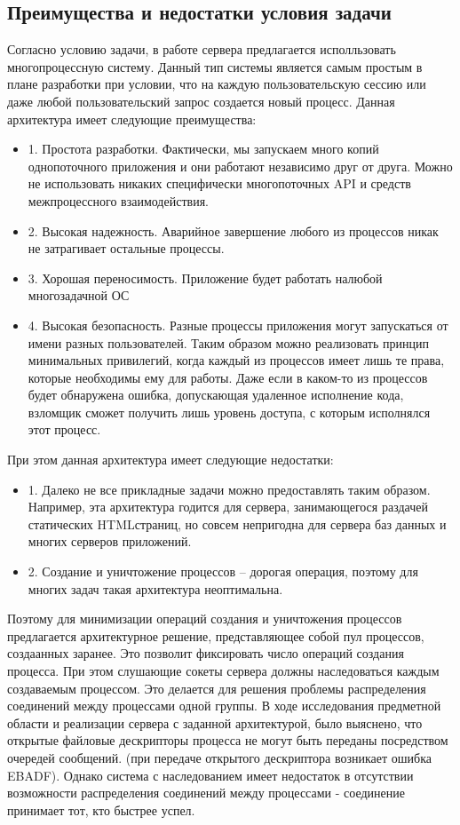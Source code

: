 \documentclass[a4paper,12pt]{report}
\begin{document}
\subsection{Преимущества и недостатки условия задачи}
Согласно условию задачи, в работе сервера предлагается исполльзовать многопроцессную систему. Данный тип системы
является самым простым в плане разработки при условии, что на каждую пользовательскую сессию или даже любой пользовательский запрос
создается новый процесс. Данная архитектура имеет следующие преимущества:
\begin{itemize}
    \item 1. Простота разработки. Фактически, мы запускаем много копий однопоточного приложения и они работают независимо друг от друга. Можно не использовать никаких специфически многопоточных API и средств межпроцессного взаимодействия.
    \item 2. Высокая надежность. Аварийное завершение любого из процессов никак не затрагивает остальные процессы.
    \item 3. Хорошая переносимость. Приложение будет работать налюбой многозадачной ОС
    \item 4. Высокая безопасность. Разные процессы приложения могут запускаться от имени разных пользователей. Таким образом можно реализовать принцип минимальных привилегий, когда каждый из процессов имеет лишь те права, которые необходимы ему для работы. Даже если в каком-то из процессов будет обнаружена ошибка, допускающая удаленное исполнение кода, взломщик сможет получить лишь уровень доступа, с которым исполнялся этот процесс.
\end{itemize}
При этом данная архитектура имеет следующие недостатки:
\begin{itemize}
    \item 1. Далеко не все прикладные задачи можно предоставлять таким образом. Например, эта архитектура годится для сервера, занимающегося раздачей статических HTMLстраниц, но совсем непригодна для сервера баз данных и многих серверов приложений.
    \item 2. Создание и уничтожение процессов – дорогая операция, поэтому для многих задач такая архитектура неоптимальна.
\end{itemize}
Поэтому для минимизации операций создания и уничтожения процессов предлагается архитектурное решение, представляющее собой пул процессов,
создаанных заранее. Это позволит фиксировать число операций создания процесса. При этом слушающие сокеты сервера должны наследоваться каждым создаваемым процессом. Это делается для решения проблемы распределения соединений между процессами одной группы. В ходе исследования предметной области и реализации сервера с заданной архитектурой, было выяснено, что открытые файловые дескрипторы процесса не могут быть переданы посредством очередей сообщений. (при передаче открытого дескриптора возникает ошибка EBADF). Однако система с наследованием имеет недостаток в отсутствии возможности распределения соединений между процессами - соединение принимает тот, кто быстрее успел.
\end{document}
